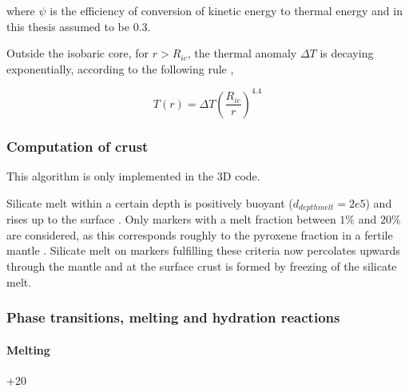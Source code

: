 where $\psi$ is the efficiency of conversion of kinetic energy to thermal energy and in this thesis assumed to be $0.3$.

Outside the isobaric core, for $r > R_{ic}$, the thermal anomaly $\Delta T$ is decaying exponentially, according to the following rule \citep{Senshu2002,Monteux2007c},

\begin{equation}
T(r) = \Delta T \left(\dfrac{R_{ic}}{r}\right)^{4.4}
\end{equation}

%
%
%

\subsubsection{Computation of crust}
\label{chp:II_2.1.7}

This algorithm is only implemented in the 3D code.

Silicate melt within a certain depth is positively buoyant ($d_{depthmelt}=2e5$) and rises up to the surface \citep{Golabek2011}. Only markers with a melt fraction between $1\%$ and $20\%$ are considered, as this corresponds roughly to the pyroxene fraction in a fertile mantle \citep{Golabek2011}. Silicate melt on markers fulfilling these criteria now percolates upwards through the mantle and at the surface crust is formed by freezing of the silicate melt. 

\subsubsection{Phase transitions, melting and hydration reactions}

\paragraph{Melting}
+20

